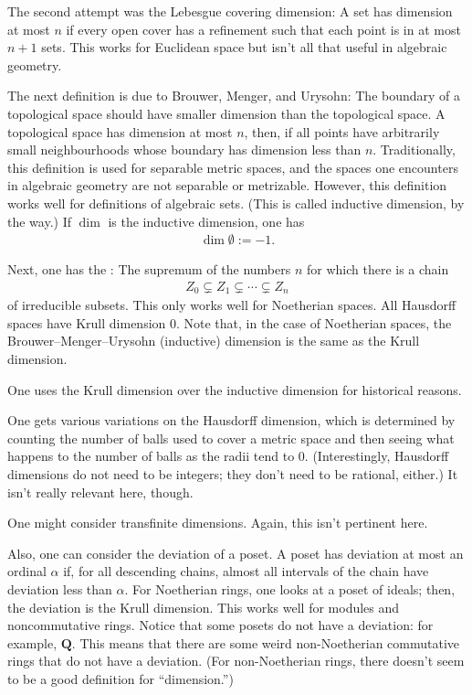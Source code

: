 \documentclass [11 pt, oneside] {article}
\begin{document}
The second attempt was the Lebesgue covering dimension: A set has dimension at most $n$ if every open cover has a refinement such that each point is in at most $n+1$ sets. This works for Euclidean space but isn't all that useful in algebraic geometry.

The next definition is due to Brouwer, Menger, and Urysohn: The boundary of a topological space should have smaller dimension than the topological space. A topological space has dimension at most $n$, then, if all points have arbitrarily small neighbourhoods whose boundary has dimension less than $n$. Traditionally, this definition is used for separable metric spaces, and the spaces one encounters in algebraic geometry are not separable or metrizable. However, this definition works well for definitions of algebraic sets. (This is called inductive dimension, by the way.) If $\dim$ is the inductive dimension, one has
\begin{align*}
	\dim \emptyset := -1.
\end{align*}

Next, one has the : The supremum of the numbers $n$ for which there is a chain
\begin{align*}
	Z_0\subsetneq Z_1\subsetneq \cdots \subsetneq Z_n
\end{align*}
of irreducible subsets. This only works well for Noetherian spaces. All Hausdorff spaces have Krull dimension $0$. Note that, in the case of Noetherian spaces, the Brouwer--Menger--Urysohn (inductive) dimension is the same as the Krull dimension.

\begin{remark}
	One uses the Krull dimension over the inductive dimension for historical reasons.
\end{remark}

One gets various variations on the Hausdorff dimension, which is determined by counting the number of balls used to cover a metric space and then seeing what happens to the number of balls as the radii tend to $0$. (Interestingly, Hausdorff dimensions do not need to be integers; they don't need to be rational, either.) It isn't really relevant here, though.

One might consider transfinite dimensions. Again, this isn't pertinent here.

Also, one can consider the deviation of a poset. A poset has deviation at most an ordinal $\alpha$ if, for all descending chains, almost all intervals of the chain have deviation less than $\alpha$. For Noetherian rings, one looks at a poset of ideals; then, the deviation is the Krull dimension. This works well for modules and noncommutative rings. Notice that some posets do not have a deviation: for example, $\mathbf{Q}$. This means that there are some weird non-Noetherian commutative rings that do not have a deviation. (For non-Noetherian rings, there doesn't seem to be a good definition for ``dimension.'')
\end{document}
